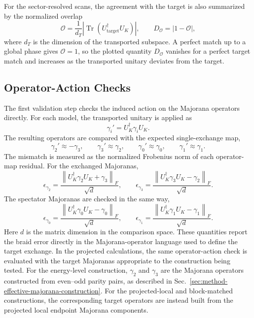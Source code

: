 For the sector-resolved scans, the agreement with the target is also summarized by the normalized overlap
\begin{equation}
\mathcal{O}
=
\frac{1}{d_T}
\left|
\operatorname{Tr}\left(U_{\mathrm{target}}^{\dagger}U_K\right)
\right|,
\qquad
D_{\mathcal{O}}=|1-\mathcal{O}|,
\label{eq:method_overlap_deviation}
\end{equation}
where \(d_T\) is the dimension of the transported subspace. A perfect match up to a global phase gives \(\mathcal{O}=1\), so the plotted quantity \(D_{\mathcal{O}}\) vanishes for a perfect target match and increases as the transported unitary deviates from the target.

\subsection{Operator-Action Checks}
The first validation step checks the induced action on the Majorana operators directly. For each model, the transported unitary is applied as
\begin{equation}
\gamma_i'
=
U_K^\dagger \gamma_i U_K.
\end{equation}
The resulting operators are compared with the expected single-exchange map,
\begin{equation}
\gamma_2' \approx -\gamma_3,
\qquad
\gamma_3' \approx \gamma_2,
\qquad
\gamma_0' \approx \gamma_0,
\qquad
\gamma_1' \approx \gamma_1.
\end{equation}
The mismatch is measured as the normalized Frobenius norm of each operator-map residual. For the exchanged Majoranas,
\begin{equation}
\epsilon_{\gamma_2}
=
\frac{
\left\|U_K^\dagger \gamma_2 U_K+\gamma_3\right\|_F
}{\sqrt{d}},
\qquad
\epsilon_{\gamma_3}
=
\frac{
\left\|U_K^\dagger \gamma_3 U_K-\gamma_2\right\|_F
}{\sqrt{d}} .
\end{equation}
The spectator Majoranas are checked in the same way,
\begin{equation}
\epsilon_{\gamma_0}
=
\frac{
\left\|U_K^\dagger \gamma_0 U_K-\gamma_0\right\|_F
}{\sqrt{d}},
\qquad
\epsilon_{\gamma_1}
=
\frac{
\left\|U_K^\dagger \gamma_1 U_K-\gamma_1\right\|_F
}{\sqrt{d}} .
\end{equation}
Here $d$ is the matrix dimension in the comparison space.
These quantities report the braid error directly in the Majorana-operator language used to define the target exchange.
In the projected calculations, the same operator-action check is evaluated with the target Majoranas appropriate to the construction being tested. For the energy-level construction, $\gamma_2$ and $\gamma_3$ are the Majorana operators constructed from even--odd parity pairs, as described in Sec.~\ref{sec:method-effective-majorana-construction}. For the projected-local and block-matched constructions, the corresponding target operators are instead built from the projected local endpoint Majorana components.

